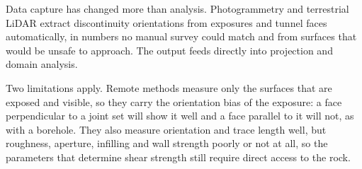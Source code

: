 Data capture has changed more than analysis. Photogrammetry and terrestrial
LiDAR extract discontinuity orientations from exposures and tunnel faces
automatically, in numbers no manual survey could match and from surfaces that
would be unsafe to approach. The output feeds directly into projection and
domain analysis.

Two limitations apply. Remote methods measure only the surfaces
that are exposed and visible, so they carry the orientation bias of the
exposure: a face perpendicular to a joint set will show it well and a
face parallel to it will not, as with a borehole. They also measure
orientation and trace length well, but roughness, aperture, infilling and wall
strength poorly or not at all, so the parameters that determine shear strength
still require direct access to the rock.

\chapterreferences
